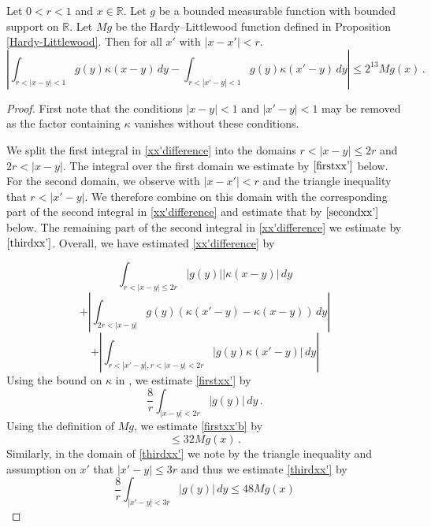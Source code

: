\begin{lemma}
\label{estimate-x-shift}
Let $0<r<1$ and $x\in \mathbb{R}$. Let $g$ be a bounded measurable function with bounded support on $\mathbb{R}$. Let $Mg$ be the Hardy--Littlewood function
defined in Proposition
\ref{Hardy-Littlewood}.
Then for all $x'$ with $|x-x'|<r$.
\begin{equation}\label{xx'difference}
\left|\int_{r<|x-y|<1}
g(y) \kappa(x-y)\, dy
-\int_{r<|x'-y|<1}
g(y) \kappa(x'-y)\, dy
\right|\le 2^{13}Mg(x)\, .
\end{equation}
\end{lemma}
\begin{proof}

First note that the
conditions $|x-y|<1$
and $|x'-y|<1$ may be removed as the factor containing $\kappa$
vanishes without these conditions.

We split the first integral in \eqref{xx'difference}
into the domains $r<|x-y|\le 2r$
and $2r<|x-y|$. The integral over the first domain we estimate
by $\eqref{firstxx'}$ below.
For the second domain, we
observe with $|x-x'|<r$ and the triangle inequality that $r<|x'-y|$. We therefore combine on this domain with the
corresponding part of the second integral in \eqref{xx'difference} and estimate that by $\eqref{secondxx'}$
below. The remaining part of the second integral in
\eqref{xx'difference} we estimate by $\eqref{thirdxx'}$.
Overall, we have estimated \eqref{xx'difference}
by


\begin{equation}
\label{firstxx'}
\int_{r<|x-y|\le 2r}
|g(y)| |\kappa(x-y)|\, dy
\end{equation}
\begin{equation}\label{secondxx'}
  + \left|\int_{2r<|x-y|}
g(y) (\kappa(x'-y)-\kappa(x-y))\, dy
\right|
\end{equation}
\begin{equation}
\label{thirdxx'}
  +\left|\int_{r<|x'-y|, r<|x-y|<2r}
|g(y) \kappa(x'-y)|\, dy
\right|
\end{equation}
Using the bound on $\kappa$ in , we estimate
\eqref{firstxx'} by
\begin{equation}
\label{firstxx'b}
 \frac 8 r\int_{|x-y|<2r}
|g(y)|\, dy\, .
\end{equation}
Using the definition of $Mg$, we estimate
\eqref{firstxx'b} by
\begin{equation}
\label{firstxx'c}
 \le 32{Mg(x)}\, .
\end{equation}
Similarly, in the domain of \eqref{thirdxx'}
we note by the triangle inequality
and assumption on $x'$ that $|x'-y|\le 3r$ and thus we estimate
\eqref{thirdxx'}
by
\begin{equation}
\label{thirdxx'b}
 \frac 8{r}\int_{|x'-y|<3r}
|g(y)| \, dy\le 48 Mg(x)
\end{equation}


\end{proof}
